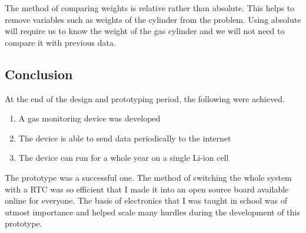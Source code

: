 The method of comparing weights is relative rather than absolute. This helps to remove variables such as weights of the cylinder from the problem. Using absolute will require us to know the weight of the gas cylinder and we will not need to compare it with previous data. 

\subsection{Conclusion}
At the end of the design and prototyping period, the following were achieved.
\begin{enumerate}
\item A gas monitoring device was developed
\item The device is able to send data periodically to the internet
\item The device can run for a whole year on a single Li-ion cell
\end{enumerate}

The prototype was a successful one. The method of switching the whole system with a RTC was so efficient that I made it into an open source board available online for everyone. The basis of electronics that I was taught in school was of utmost importance and helped scale many hurdles during the development of this prototype.




